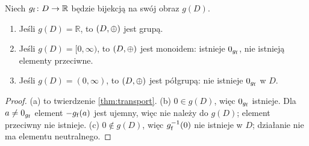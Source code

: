 \documentclass[11pt,a4paper]{article}
\begin{document}
\begin{proposition}
\label{prop:classification}
Niech $g_{\mathrm{f}}\colon D\to\mathbb{R}$ będzie bijekcją na swój obraz $g(D)$.
\begin{enumerate}[label=(\alph*),leftmargin=2.2em]
  \item Jeśli $g(D)=\mathbb{R}$, to $(D,\mathbin{\oplus})$ jest grupą.
  \item Jeśli $g(D)=[0,\infty)$, to $(D,\mathbin{\oplus})$ jest monoidem: istnieje
        $0_{g_{\mathrm{f}}}$, nie istnieją elementy przeciwne.
  \item Jeśli $g(D)=(0,\infty)$, to $(D,\mathbin{\oplus})$ jest półgrupą: nie istnieje
        $0_{g_{\mathrm{f}}}$ w $D$.
\end{enumerate}
\end{proposition}

\begin{proof}
(a) to twierdzenie \ref{thm:transport}. (b) $0\in g(D)$, więc $0_{g_{\mathrm{f}}}$ istnieje.
Dla $a\neq0_{g_{\mathrm{f}}}$ element $-g_{\mathrm{f}}(a)$ jest ujemny, więc nie należy do $g(D)$;
element przeciwny nie istnieje. (c) $0\notin g(D)$, więc $g_{\mathrm{f}}^{-1}(0)$ nie istnieje
w $D$; działanie nie ma elementu neutralnego.
\end{proof}
\end{document}
